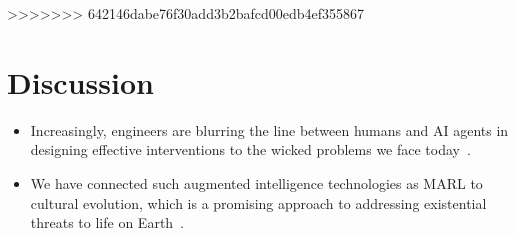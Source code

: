 \documentclass[letterpaper,11.5pt]{scrartcl}
\begin{document}





>>>>>>> 642146dabe76f30add3b2bafcd00edb4ef355867


\section{Discussion}

\begin{itemize}
  \item 
    Increasingly, engineers are blurring the line between humans and AI agents in designing
    effective interventions to the wicked problems we face
    today~\cite{Irrgang2021,Rolnick2022}.
  \item
    We have connected such augmented intelligence technologies as MARL to
    cultural evolution, which is a promising approach to addressing existential
    threats to life on Earth~\cite{Jones2021}.
\end{itemize}





\end{document}
